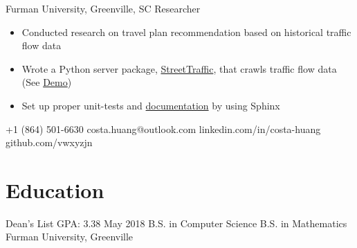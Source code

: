 \documentclass{tccv}
\begin{document}
\begin{eventlist}
     {Furman University, Greenville, SC}
     {Researcher}
\begin{itemize}
    \item Conducted research on travel plan recommendation based on
historical traffic flow data
    \item Wrote a Python server package, \href{https://streettraffic.org/}{StreetTraffic}, that crawls traffic flow data (See \href{http://demo.streettraffic.org/}{Demo})
    \item Set up proper unit-tests and \href{https://streettraffic.org/docs/modules/streettraffic.html#module-streettraffic.database}{documentation} by using Sphinx
\end{itemize}



\end{eventlist}

    {+1 (864) 501-6630}
    {costa.huang@outlook.com}
    {linkedin.com/in/costa-huang}
    {github.com/vwxyzjn}

\section{Education}

\begin{yearlist}

\item[Dean's List \newline GPA: 3.38]{May 2018}
     {B.S. in Computer Science \newline B.S. in Mathematics}
     {Furman University, Greenville}

\end{yearlist}
\end{document}
